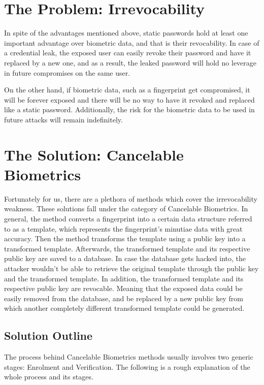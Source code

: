 \documentclass[fyp]{socreport}
\begin{document}
\section{The Problem: Irrevocability}
In spite of the advantages mentioned above, static passwords hold at least one important advantage over biometric data, and that is their revocability. In case of a credential leak, the exposed user can easily revoke their password and have it replaced by a new one, and as a result, the leaked password will hold no leverage in future compromises on the same user.

On the other hand, if biometric data, such as a fingerprint get compromised, it will be forever exposed and there will be no way to have it revoked and replaced like a static password. Additionally, the risk for the biometric data to be used in future attacks will remain indefinitely.

\section{The Solution: Cancelable Biometrics}
Fortunately for us, there are a plethora of methods which cover the irrevocability weakness. These solutions fall under the category of Cancelable Biometrics. In general, the method converts a fingerprint into a certain data structure referred to as a template, which represents the fingerprint's minutiae data with great accuracy. Then the method transforms the template using a public key into a transformed template. Afterwards, the transformed template and its respective public key are saved to a database. In case the database gets hacked into, the attacker wouldn't be able to retrieve the original template through the public key and the transformed template. In addition, the transformed template and its respective public key are revocable. Meaning that the exposed data could be easily removed from the database, and be replaced by a new public key from which another completely different transformed template could be generated.

\subsection{Solution Outline}
The process behind Cancelable Biometrics methods usually involves two generic stages: Enrolment and Verification. The following is a rough explanation of the whole process and its stages.
\end{document}
